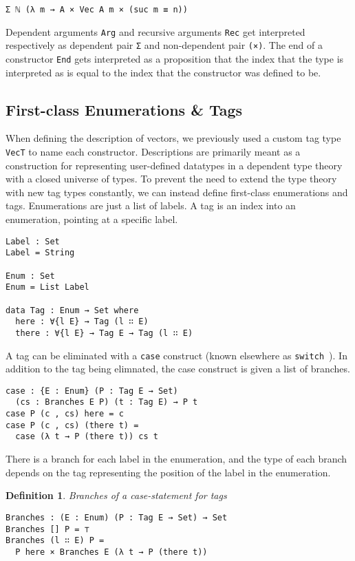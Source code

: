 \documentclass[preprint,nonatbib]{sigplanconf}
\newtheorem{definition}{Definition}
\begin{document}
\begin{verbatim}
Σ ℕ (λ m → A × Vec A m × (suc m ≡ n))
\end{verbatim}

Dependent arguments {\tt Arg} and recursive arguments
{\tt Rec} get interpreted respectively as dependent pair
{\tt Σ} and non-dependent pair {\tt (×)}. The end of a constructor
{\tt End} gets interpreted as a proposition that the index that the
type is interpreted as is equal to the index that the constructor was
defined to be.

\subsection{First-class Enumerations \& Tags}
\label{sec:background:case}

When defining the description of vectors, we previously used a custom
tag type {\tt VecT} to name each constructor. Descriptions are
primarily meant as a construction for representing user-defined
datatypes in a dependent type theory with a closed universe of types.
To prevent the need to extend the type theory with new tag types
constantly, we can instead define first-class enumerations and tags.
Enumerations are just a list of labels. A tag is an index into an
enumeration, pointing at a specific label.

\begin{verbatim}
Label : Set
Label = String

Enum : Set
Enum = List Label

data Tag : Enum → Set where
  here : ∀{l E} → Tag (l ∷ E)
  there : ∀{l E} → Tag E → Tag (l ∷ E)
\end{verbatim}

A tag can be eliminated with a {\tt case} construct (known elsewhere as
{\tt switch}~\citep{Chapman:2010:GAL:1932681.1863547,dagand:phd}).
In addition to the tag being elimnated, the case construct is given a
list of branches.

\begin{verbatim}
case : {E : Enum} (P : Tag E → Set)
  (cs : Branches E P) (t : Tag E) → P t
case P (c , cs) here = c
case P (c , cs) (there t) =
  case (λ t → P (there t)) cs t
\end{verbatim}

There is a branch for each label in the enumeration, and the type of
each branch depends on the tag representing the position of the label
in the enumeration.

\begin{definition}\label{def:branches}
Branches of a case-statement for tags

\begin{verbatim}
Branches : (E : Enum) (P : Tag E → Set) → Set
Branches [] P = ⊤
Branches (l ∷ E) P =
  P here × Branches E (λ t → P (there t))
\end{verbatim}

\end{definition}
\end{document}
